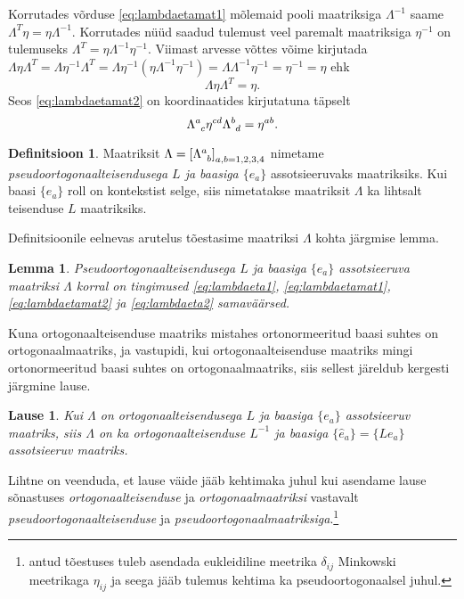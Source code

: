 \documentclass[12pt,a4paper,oneside]{article}
\theoremstyle{plain}
\newtheorem{lemma}{Lemma}[section]
\newtheorem{lause}{Lause}[section]
\theoremstyle{definition}
\newtheorem{definitsioon}{Definitsioon}[section]
\numberwithin{equation}{section}
\begin{document}
Korrutades võrduse \ref{eq:lambdaetamat1} mõlemaid pooli maatriksiga 
$\Lambda^{-1}$ saame $\Lambda^T \eta = \eta \Lambda^{-1}$. Korrutades 
nüüd saadud tulemust veel paremalt maatriksiga $\eta^{-1}$ on 
tulemuseks $\Lambda^T = \eta \Lambda^{-1} \eta^{-1}$. Viimast arvesse 
võttes võime kirjutada $\Lambda \eta \Lambda^T = \Lambda \eta^{-1} 
\Lambda^T = \Lambda \eta^{-1} \left( \eta \Lambda^{-1} \eta^{-1} 
\right) = \Lambda \Lambda^{-1} \eta^{-1} = \eta^{-1} = \eta$ ehk
\begin{equation} \label{eq:lambdaetamat2}
\Lambda \eta \Lambda^T = \eta.
\end{equation}
Seos \ref{eq:lambdaetamat2} on koordinaatides kirjutatuna täpselt
\begin{equation} \label{eq:lambdaeta2}
\Lambda\indices{^a_c} \eta^{cd} \Lambda\indices{^b_d} = \eta^{ab}.
\end{equation}

\begin{definitsioon}
Maatriksit $\Lambda = \left[\Lambda\indices{^a_b} 
\right]_{a,b=1,2,3,4}$ nimetame \emph{pseudoortogonaalteisendusega 
$L$ ja baasiga $\{e_a\}$} assotsieeruvaks maatriksiks. Kui baasi 
$\{e_a\}$ roll on kontekstist selge, siis nimetatakse maatriksit 
$\Lambda$ ka lihtsalt teisenduse $L$ maatriksiks.
\end{definitsioon}

Definitsioonile eelnevas arutelus tõestasime maatriksi $\Lambda$ 
kohta järgmise lemma.
\begin{lemma} \label{lemma:lambdainvariant}
Pseudoortogonaalteisendusega $L$ ja baasiga $\{e_a\}$ assotsieeruva 
maatriksi $\Lambda$ korral on tingimused \ref{eq:lambdaeta1}, 
\ref{eq:lambdaetamat1}, \ref{eq:lambdaetamat2} ja \ref{eq:lambdaeta2} 
samaväärsed.
\end{lemma}

Kuna ortogonaalteisenduse maatriks mistahes ortonormeeritud baasi 
suhtes on ortogonaalmaatriks, ja vastupidi, kui ortogonaalteisenduse 
maatriks mingi ortonormeeritud baasi suhtes on ortogonaalmaatriks, 
siis sellest järeldub kergesti järgmine lause.

\begin{lause}\textnormal{\cite[lk 271]{Kilp}}
Kui $\Lambda$ on ortogonaalteisendusega $L$ ja baasiga $\{e_a\}$ 
assotsieeruv maatriks, siis $\Lambda$ on ka ortogonaalteisenduse 
$L^{-1}$ ja baasiga $\{\hat{e}_a\} = \{Le_a\}$ assotsieeruv maatriks.
\end{lause}

Lihtne on veenduda, et lause väide jääb kehtimaka juhul kui asendame 
lause sõnastuses \emph{ortogonaalteisenduse} ja 
\emph{ortogonaalmaatriksi} vastavalt \emph{pseudoortogonaalteisenduse} 
ja \emph{pseudoortogonaalmaatriksiga}.\footnote{\cite{Kilp} antud 
tõestuses tuleb asendada eukleidiline meetrika $\delta_{ij}$ 
Minkowski meetrikaga $\eta_{ij}$ ja seega jääb tulemus kehtima 
ka pseudoortogonaalsel juhul.}
\end{document}
